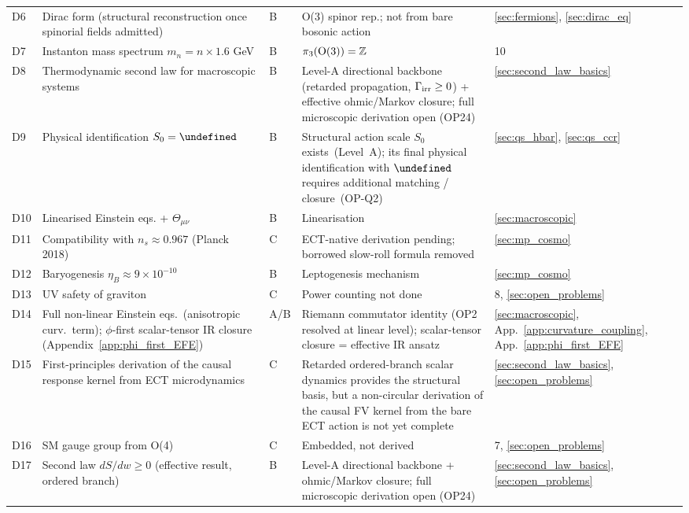 \documentclass[11pt,a4paper]{article}
\let\hbar\undefined
\numberwithin{equation}{section}
\begin{document}
\begin{longtable}{@{}p{}p{}p{}p{}p{}@{}}
D6 & Dirac form (structural reconstruction once spinorial fields admitted) & B & O(3) spinor rep.; not from bare bosonic action & \ref{sec:fermions}, \ref{sec:dirac_eq} \\
D7 & Instanton mass spectrum $m_n=n\times1.6$ GeV & B & $\pi_3({\rm O(3)})=\mathbb{Z}$ & 10 \\
D8 & Thermodynamic second law for macroscopic systems & B & Level-A directional backbone (retarded propagation, $\Gamma_{\rm irr}\geq 0$) + effective ohmic/Markov closure; full microscopic derivation open (OP24) & \ref{sec:second_law_basics} \\
D9 & Physical identification $S_0=\hbar$ & B & Structural action scale $S_0$ exists~(Level~A); its final physical identification with $\hbar$ requires additional matching / closure~(OP-Q2) & \ref{sec:qs_hbar}, \ref{sec:qs_ccr} \\
D10 & Linearised Einstein eqs. + $\Theta_{\mu\nu}$ & B & Linearisation & \ref{sec:macroscopic} \\
D11 & Compatibility with $n_s\approx0.967$ (Planck 2018) & C & ECT-native derivation pending; borrowed slow-roll formula removed & \ref{sec:mp_cosmo} \\
D12 & Baryogenesis $\eta_B\approx9\times10^{-10}$ & B & Leptogenesis mechanism & \ref{sec:mp_cosmo} \\
D13 & UV safety of graviton & C & Power counting not done & 8, \ref{sec:open_problems} \\
D14 & Full non-linear Einstein eqs.\ (anisotropic curv.\ term); $\phi$-first scalar-tensor IR closure (Appendix~\ref{app:phi_first_EFE}) & A/B & Riemann commutator identity (OP2 resolved at linear level); scalar-tensor closure = effective IR ansatz & \ref{sec:macroscopic}, App.~\ref{app:curvature_coupling}, App.~\ref{app:phi_first_EFE} \\
D15 & First-principles derivation of the causal response kernel from ECT microdynamics & C & Retarded ordered-branch scalar dynamics provides the structural basis, but a non-circular derivation of the causal FV kernel from the bare ECT action is not yet complete & \ref{sec:second_law_basics}, \ref{sec:open_problems} \\
D16 & SM gauge group from O(4) & C & Embedded, not derived & 7, \ref{sec:open_problems} \\
D17 & Second law $dS/dw\geq0$ (effective result, ordered branch) & B & Level-A directional backbone + ohmic/Markov closure; full microscopic derivation open (OP24) & \ref{sec:second_law_basics}, \ref{sec:open_problems} \\

\end{longtable}
\end{document}
